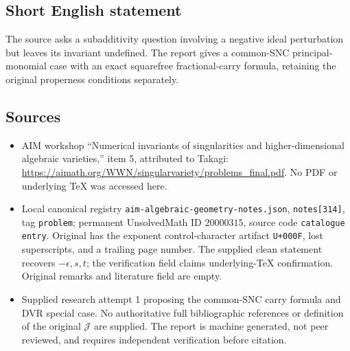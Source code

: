 \documentclass[11pt]{article}
\begin{document}
\subsection{Short English statement}
The source asks a subadditivity question involving a negative ideal perturbation but leaves its invariant undefined. The report gives a common-SNC principal-monomial case with an exact squarefree fractional-carry formula, retaining the original properness conditions separately.
\subsection{Sources}
\begin{itemize}
\item AIM workshop ``Numerical invariants of singularities and higher-dimensional algebraic varieties,'' item 5, attributed to Takagi: \url{https://aimath.org/WWN/singularvariety/problems_final.pdf}. No PDF or underlying TeX was accessed here.
\item Local canonical registry \texttt{aim-algebraic-geometry-notes.json}, \texttt{notes[314]}, tag \texttt{problem}; permanent UnsolvedMath ID \(20000315\), source code \texttt{catalogue entry}. Original has the exponent control-character artifact \texttt{U+000F}, lost superscripts, and a trailing page number. The supplied clean statement recovers \(-\epsilon,s,t\); the verification field claims underlying-TeX confirmation. Original remarks and literature field are empty.
\item Supplied research attempt 1 proposing the common-SNC carry formula and DVR special case. No authoritative full bibliographic references or definition of the original \(\mathcal J\) are supplied. The report is machine generated, not peer reviewed, and requires independent verification before citation.
\end{itemize}
\end{document}
